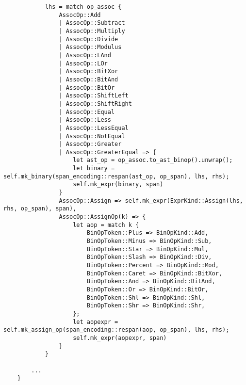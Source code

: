 \begin{itemize}
\begin{lstlisting}
            lhs = match op_assoc {
                AssocOp::Add
                | AssocOp::Subtract
                | AssocOp::Multiply
                | AssocOp::Divide
                | AssocOp::Modulus
                | AssocOp::LAnd
                | AssocOp::LOr
                | AssocOp::BitXor
                | AssocOp::BitAnd
                | AssocOp::BitOr
                | AssocOp::ShiftLeft
                | AssocOp::ShiftRight
                | AssocOp::Equal
                | AssocOp::Less
                | AssocOp::LessEqual
                | AssocOp::NotEqual
                | AssocOp::Greater
                | AssocOp::GreaterEqual => {
                    let ast_op = op_assoc.to_ast_binop().unwrap();
                    let binary = self.mk_binary(span_encoding::respan(ast_op, op_span), lhs, rhs);
                    self.mk_expr(binary, span)
                }
                AssocOp::Assign => self.mk_expr(ExprKind::Assign(lhs, rhs, op_span), span),
                AssocOp::AssignOp(k) => {
                    let aop = match k {
                        BinOpToken::Plus => BinOpKind::Add,
                        BinOpToken::Minus => BinOpKind::Sub,
                        BinOpToken::Star => BinOpKind::Mul,
                        BinOpToken::Slash => BinOpKind::Div,
                        BinOpToken::Percent => BinOpKind::Mod,
                        BinOpToken::Caret => BinOpKind::BitXor,
                        BinOpToken::And => BinOpKind::BitAnd,
                        BinOpToken::Or => BinOpKind::BitOr,
                        BinOpToken::Shl => BinOpKind::Shl,
                        BinOpToken::Shr => BinOpKind::Shr,
                    };
                    let aopexpr = self.mk_assign_op(span_encoding::respan(aop, op_span), lhs, rhs);
                    self.mk_expr(aopexpr, span)
                }
            }
        
        ...
    }        
\end{lstlisting}
\end{itemize}


